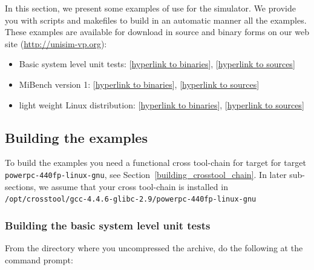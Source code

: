 In this section, we present some examples of use for the simulator.
We provide you with scripts and makefiles to build in an automatic manner all the examples.
These examples are available for download in source and binary forms on our web site (\url{http://unisim-vp.org}):
\begin{itemize}
\item Basic system level unit tests: [\href{http://unisim-vp.org/site/downloads/virtual-platforms/powerpc/virtex5fxt/unisim-virtex5fxt-basic-system-level-unit-tests-bin-v1.tar.gz}{hyperlink to binaries}], [\href{http://unisim-vp.org/site/downloads/virtual-platforms/powerpc/virtex5fxt/unisim-virtex5fxt-basic-system-level-unit-tests-source-v1.tar.gz}{hyperlink to sources}]
\item MiBench version 1: [\href{http://unisim-vp.org/site/downloads/other/benchmarks/mibench/mibench-v1-bin-powerpc-440fp-linux-gnu-v1.tar.gz}{hyperlink to binaries}], [\href{http://unisim-vp.org/site/downloads/other/benchmarks/mibench/mibench-v1-source-powerpc-440fp-linux-gnu-v1.tar.gz}{hyperlink to sources}]
\item light weight Linux distribution: [\href{http://unisim-vp.org/site/downloads/other/benchmarks/linux-distro/unisim-virtex5fxt-linux-distro-bin-v1.tar.gz}{hyperlink to binaries}], [\href{http://unisim-vp.org/site/downloads/other/benchmarks/linux-distro/unisim-virtex5fxt-linux-distro-source-v1.tar.gz}{hyperlink to sources}]
\end{itemize}

\subsection{Building the examples}

To build the examples you need a functional cross tool-chain for target for target \texttt{powerpc-440fp-linux-gnu}, see Section~\ref{building_crosstool_chain}.
In later sub-sections, we assume that your cross tool-chain is installed in \texttt{/opt/crosstool/gcc-4.4.6-glibc-2.9/powerpc-440fp-linux-gnu}

\subsubsection{Building the basic system level unit tests}

From the directory where you uncompressed the archive, do the following at the command prompt:

